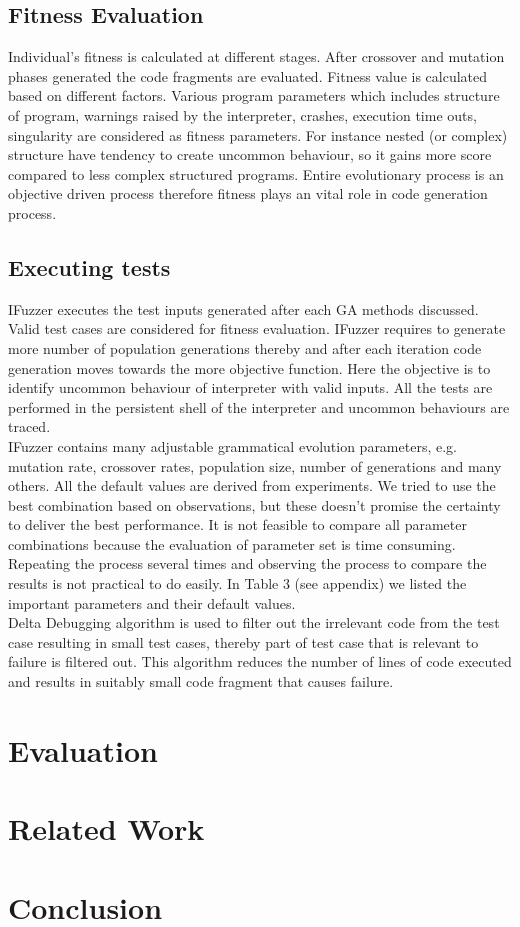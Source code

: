 \documentclass{sig-alternate}
\begin{document}
\subsection{Fitness Evaluation} \label{sec:fitness}
Individual's fitness is calculated at different stages. After crossover and mutation phases generated the code fragments are evaluated. Fitness value is calculated based on different factors. Various program parameters which includes structure of program, warnings raised by the interpreter, crashes, execution time outs, singularity are considered as fitness parameters. For instance nested (or complex) structure have tendency to create uncommon behaviour, so it gains more score compared to less complex structured programs. Entire evolutionary process is an objective driven process therefore fitness plays an vital role in code generation process. 

\subsection{Executing tests}
IFuzzer executes the test inputs generated after each GA methods discussed. Valid test cases are considered for fitness evaluation. IFuzzer requires to generate more number of population generations thereby and after each iteration code generation moves towards the more objective function. Here the objective is to identify uncommon behaviour of interpreter with valid inputs. All the tests are performed in the persistent shell of the interpreter and uncommon behaviours are traced. \\ 
\indent IFuzzer contains many adjustable grammatical evolution parameters, e.g. mutation rate, crossover rates, population size, number of generations and many others. All the default values are derived from experiments. We tried to use the best combination based on observations, but these doesn't promise the certainty to deliver the best performance. It is not feasible to compare all parameter combinations because the evaluation of parameter set is time consuming. Repeating the process several times and observing the process to compare the results is not practical to do easily. In Table 3 (see appendix) we listed the important parameters and their default values.\\
\indent  Delta Debugging algorithm is used to filter out the irrelevant code from the test case resulting in small test cases, thereby part of test case that is relevant to failure is filtered out. This algorithm reduces the number of lines of code executed and  results in suitably small code fragment that causes failure.


\section{Evaluation}
\section{Related Work}
\section{Conclusion}
\end{document}
